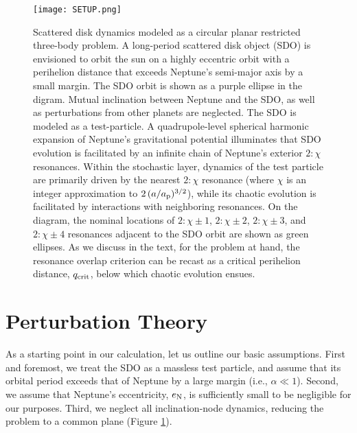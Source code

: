 \documentclass[twocolumn]{aastex62}
\newcommand{\en}{e_{\rm{N}}}
\begin{document}
\begin{figure*}[t]
\centering
\texttt{[image: SETUP.png]}
\caption{Scattered disk dynamics modeled as a circular planar restricted three-body problem. A long-period scattered disk object (SDO) is envisioned to orbit the sun on a highly eccentric orbit with a perihelion distance that exceeds Neptune’s semi-major axis by a small margin. The SDO orbit is shown as a purple ellipse in the digram. Mutual inclination between Neptune and the SDO, as well as perturbations from other planets are neglected. The SDO is modeled as a test-particle. A quadrupole-level spherical harmonic expansion of Neptune’s gravitational potential illuminates that SDO evolution is facilitated by an infinite chain of Neptune's exterior $2:\chi$ resonances. Within the stochastic layer, dynamics of the test particle are primarily driven by the nearest $2:\chi$ resonance (where $\chi$ is an integer approximation to $2\,(a/a_{\rm{p}})^{3/2}$), while its chaotic evolution is facilitated by interactions with neighboring resonances. On the diagram, the nominal locations of $2:\chi\pm1$, $2:\chi\pm2$, $2:\chi\pm3$, and $2:\chi\pm4$ resonances adjacent to the SDO orbit are shown as green ellipses. As we discuss in the text, for the problem at hand, the resonance overlap criterion can be recast as a critical perihelion distance, $q_{\rm{crit}}$, below which chaotic evolution ensues.}
\label{Fig:SETUP}
\end{figure*}

\section{Perturbation Theory} \label{sec:anmodel}
As a starting point in our calculation, let us outline our basic assumptions. First and foremost, we treat the SDO as a massless test particle, and assume that its orbital period exceeds that of Neptune by a large margin (i.e., $\alpha\ll1$). Second, we assume that Neptune's eccentricity, $\en$, is sufficiently small to be negligible for our purposes. Third, we neglect all inclination-node dynamics, reducing the problem to a common plane (Figure \ref{Fig:SETUP}). 
\end{document}
